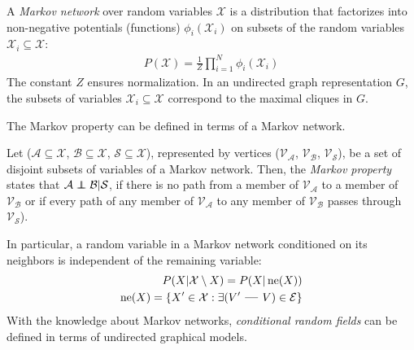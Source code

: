 \begin{mydef}
    \label{def:markov-network}
    A \emph{Markov network} over random variables $\mathcal{X}$ is a distribution that factorizes
    into non-negative potentials (functions) $\phi_i(\mathcal{X}_i)$ on subsets of the random
    variables $\mathcal{X}_i\subseteq\mathcal{X}$:
    \begin{align}
        \label{eq:markov-network}
        P(\mathcal{X}) = \frac{1}{Z}\prod_{i=1}^N\phi_i(\mathcal{X}_i)
    \end{align}
    The constant $Z$ ensures normalization. In an undirected graph representation $G$, the subsets
    of variables $\mathcal{X}_i\subseteq\mathcal{X}$ correspond to the maximal cliques in $G$.
\end{mydef}
The Markov property can be defined in terms of a Markov network.
\begin{mydef}
    \label{def:markov-property}
    Let ($\mathcal{A}\subseteq\mathcal{X}$, $\mathcal{B}\subseteq\mathcal{X}$,
    $\mathcal{S}\subseteq\mathcal{X}$), represented by vertices ($\mathcal{V}_{\mathcal{A}}$,
    $\mathcal{V}_{\mathcal{B}}$, $\mathcal{V}_{\mathcal{S}}$), be a set of disjoint subsets of
    variables of a Markov network. Then, the \emph{Markov property} states that $\mathcal{A}
    \independent \mathcal{B} | \mathcal{S}$, if there is no path from a member of
    $\mathcal{V}_{\mathcal{A}}$ to a member of $\mathcal{V}_{\mathcal{B}}$ or if every path of any
    member of $\mathcal{V}_{\mathcal{A}}$ to any member of $\mathcal{V}_{\mathcal{B}}$ passes
    through $\mathcal{V}_{\mathcal{S}}$).
\end{mydef}

In particular, %
a random variable in a Markov network conditioned on its neighbors is independent of the remaining
variable:
\begin{align}
    \label{eq:local-markov-property}
    P(X|\mathcal{X}\setminus X) = P(X|\operatorname{ne}(X)) \\
    \operatorname{ne}(X) = \{X^{\prime} \in \mathcal{X} : \exists (V^{\prime} \textbf{ --- } V) \in \mathcal{E}\}
\end{align}
With the knowledge about Markov networks, \emph{conditional random fields} can be defined in terms
of undirected graphical models.

